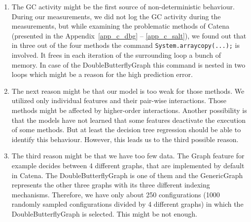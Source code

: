 \begin{enumerate}
	\item The \ac{GC} activity might be the first source of non-deterministic behaviour. During our measurements, we did not log the \ac{GC} activity during the measurements, but while examining the problematic methods of Catena (presented in the Appendix~\ref{app_c_dbg} -- \ref{app_c_salt}), we found out that in three out of the four methods the command \texttt{System.arraycopy(...);} is involved. It frees in each iteration of the surrounding loop a bunch of memory. In case of the DoubleButterflyGraph this command is nested in two loops which might be a reason for the high prediction error. 
	\item The next reason might be that our model is too weak for those methods. We utilized only individual features and their pair-wise interactions. Those methods might be affected by higher-order interactions. Another possibility is that the models have not learned that some features deactivate the execution of some methods. But at least the decision tree regression should be able to identify this behaviour. However, this leads us to the third possible reason.
	\item The third reason might be that we have too few data. The Graph feature for example decides between 4 different graphs, that are implemented by default in Catena. The DoubleButterflyGraph is one of them and the GenericGraph represents the other three graphs with its three different indexing mechanisms. Therefore, we have only about 250 configurations (1000 randomly sampled configurations divided by 4 different graphs) in which the DoubleButterflyGraph is selected. This might be not enough.
\end{enumerate}


%


